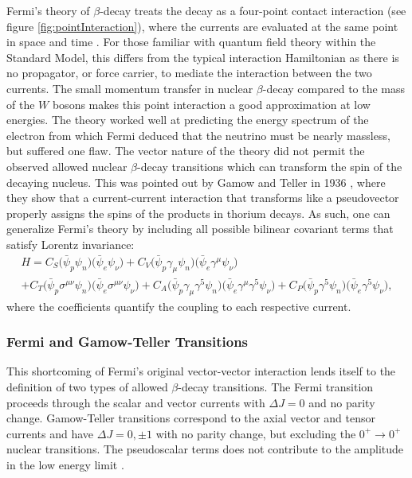 Fermi's theory of $\beta$-decay treats the decay as a four-point contact interaction
(see figure \ref{fig:pointInteraction}), where
the currents are evaluated at the same point in space and time \cite{renton1990}. For those
familiar with quantum field theory within the Standard Model, this differs from the typical
interaction Hamiltonian as there is no propagator, or force carrier, to mediate the
interaction between the two currents. The small momentum transfer in nuclear
$\beta$-decay compared to the mass of the $W$ bosons makes this point interaction a good
approximation at low energies.  The theory
worked well at predicting the energy spectrum of the electron from which
Fermi deduced that the neutrino must be nearly massless, but suffered one flaw. The vector
nature of the theory did not permit the observed allowed nuclear $\beta$-decay transitions
which can transform the spin of the decaying nucleus. This was pointed out by Gamow and Teller in
1936 \cite{gamow1936}, where they show that a current-current interaction that transforms like
a pseudovector properly assigns the spins of the products in thorium decays. As such,
one can generalize Fermi's theory by including all possible bilinear covariant terms that
satisfy Lorentz invariance:
%
\begin{multline}
  H = C_S\big( \bar{\psi}_p \psi_n \big) \big( \bar{\psi}_e  \psi_\nu \big) 
  +C_V\big( \bar{\psi}_p \gamma_\mu \psi_n \big) \big( \bar{\psi}_e \gamma^\mu \psi_\nu \big) \\
  +C_T\big( \bar{\psi}_p \sigma^{\mu\nu} \psi_n \big) \big( \bar{\psi}_e \sigma^{\mu\nu} \psi_\nu \big) 
  +C_A\big( \bar{\psi}_p \gamma_\mu \gamma^5 \psi_n \big) \big( \bar{\psi}_e \gamma^\mu \gamma^5 \psi_\nu \big) 
  +C_P\big( \bar{\psi}_p  \gamma^5 \psi_n \big) \big( \bar{\psi}_e  \gamma^5 \psi_\nu \big),
  \label{eq:FermiFull}
\end{multline}
%
where the coefficients quantify the coupling to each respective current.

\subsubsection{Fermi and Gamow-Teller Transitions}

This shortcoming of Fermi's original vector-vector interaction
lends itself to the definition of
two types of allowed $\beta$-decay transitions. The Fermi transition proceeds through the
scalar and vector currents with $\Delta J=0$ and no parity change. Gamow-Teller transitions
correspond to the axial vector and tensor currents and have $\Delta J=0,\pm1$ with no parity change,
but excluding the $0^+\rightarrow 0^+$ nuclear transitions. The pseudoscalar terms does not
contribute to the amplitude in the low energy limit \cite{renton1990}.
 

